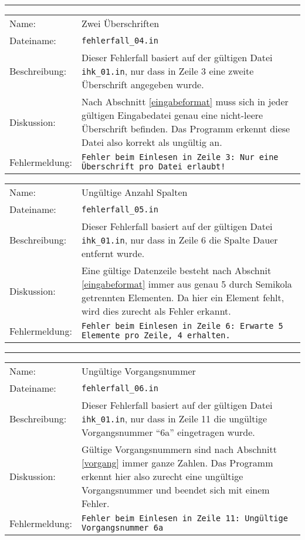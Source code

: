 \hrule
\begin{tabularx}{\textwidth}{l X}
  Name: & Zwei \"Uberschriften \\
  Dateiname: & \texttt{fehlerfall\_04.in} \\
  Beschreibung: & Dieser Fehlerfall basiert auf der g\"ultigen Datei
  \texttt{ihk\_01.in}, nur dass in Zeile 3 eine zweite \"Uberschrift
  angegeben wurde. \\
  Diskussion: & Nach Abschnitt \ref{eingabeformat} muss sich in jeder
  g\"ultigen Eingabedatei genau eine nicht-leere \"Uberschrift
  befinden. Das Programm erkennt diese Datei also korrekt als
  ung\"ultig an. \\
  Fehlermeldung: & \texttt{Fehler beim Einlesen in Zeile 3: Nur eine
    Überschrift pro Datei erlaubt!} \\
\end{tabularx}
\begin{tabularx}{\textwidth}{l X}
  Name: & Ung\"ultige Anzahl Spalten \\
  Dateiname: & \texttt{fehlerfall\_05.in} \\
  Beschreibung: & Dieser Fehlerfall basiert auf der g\"ultigen Datei
  \texttt{ihk\_01.in}, nur dass in Zeile 6 die Spalte Dauer entfernt
  wurde. \\
  Diskussion: & Eine g\"ultige Datenzeile besteht nach Abschnit
  \ref{eingabeformat} immer aus genau 5 durch Semikola getrennten
  Elementen. Da hier ein Element fehlt, wird dies zurecht als Fehler
  erkannt.\\
  Fehlermeldung: & \texttt{Fehler beim Einlesen in Zeile 6: Erwarte 5
    Elemente pro Zeile, 4 erhalten.} \\
\end{tabularx}
\hrule
\begin{tabularx}{\textwidth}{l X}
  Name: & Ung\"ultige Vorgangsnummer \\
  Dateiname: & \texttt{fehlerfall\_06.in} \\
  Beschreibung: & Dieser Fehlerfall basiert auf der g\"ultigen Datei
  \texttt{ihk\_01.in}, nur dass in Zeile 11 die ung\"ultige
  Vorgangsnummer ``6a'' eingetragen wurde. \\
  Diskussion: & G\"ultige Vorgangsnummern sind nach Abschnitt
  \ref{vorgang} immer ganze Zahlen. Das Programm erkennt hier also
  zurecht eine ung\"ultige Vorgangsnummer und beendet sich mit einem
  Fehler.\\
  Fehlermeldung: & \texttt{Fehler beim Einlesen in Zeile 11: Ungültige
    Vorgangsnummer 6a} \\
\end{tabularx}
